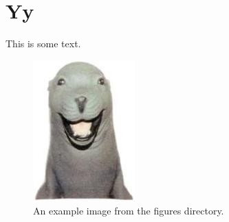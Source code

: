 \chapter{Yy} \label{ch:yy}

This is some text.
\begin{figure}[ht]
    \centering
    \includegraphics{figures/im_scratchyseal.jpg}
    \caption{An example image from the figures directory.}
    \label{fig:example}
\end{figure}